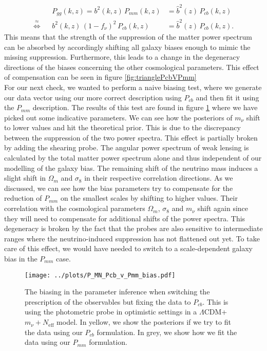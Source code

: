 \documentclass[../main.tex]{subfiles}
\begin{document}
\begin{align}
    &&P_{gg}(k,z) = b^2(k,z)\,P_{mm}(k,z) &= \hat{b}^2(z)\,P_{cb}(k,z)\nonumber\\
    \overset{\approx}{\Longleftrightarrow}&& b^2(k,z)\,(1-f_\nu)^2\,P_{cb}(k,z) &= \hat{b}^2(z)\,P_{cb}(k,z).\nonumber
\end{align}
This means that the strength of the suppression of the matter power spectrum can be absorbed by accordingly shifting all galaxy biases enough to mimic the missing suppression. Furthermore, this leads to a change in the degeneracy directions of the biases concerning the other cosmological parameters. This effect of compensation can be seen in figure \ref{fig:trianglePcbVPmm}\\
For our next check, we wanted to perform a naive biasing test, where we generate our data vector using our more correct description using $P_{cb}$ and then fit it using the $P_{mm}$ description. The results of this test are found in figure \ref{fig:trianglePcbVPmm_biased} where we have picked out some indicative parameters. We can see how the posteriors of $m_\nu$ shift to lower values and hit the theoretical prior. This is due to the discrepancy between the suppression of the two power spectra. This effect is partially broken by adding the shearing probe. The angular power spectrum of weak lensing is calculated by the total matter power spectrum alone and thus independent of our modelling of the galaxy bias. The remaining shift of the neutrino mass induces a slight shift in $\Omega_m$ and $\sigma_8$ in their respective correlation directions. As we discussed, we can see how the bias parameters try to compensate for the reduction of $P_{mm}$ on the smallest scales by shifting to higher values. Their correlation with the cosmological parameters $\Omega_m$, $\sigma_8$ and $m_\nu$ shift again since they will need to compensate for additional shifts of the power spectra. This degeneracy is broken by the fact that the probes are also sensitive to intermediate ranges where the neutrino-induced suppression has not flattened out yet. To take care of this effect, we would have needed to switch to a scale-dependent galaxy bias in the $P_{mm}$ case.\newline
\begin{figure}
    \centering
    \caption{The biasing in the parameter inference when switching the prescription of the observables but fixing the data to $P_{cb}$. This is using the photometric probe in optimistic settings in a $\Lambda$CDM+$m_\nu+N_\mathrm{eff}$ model. In yellow, we show the posteriors if we try to fit the data using our $P_{cb}$ formulation. In grey, we show how we fit the data using our $P_{mm}$ formulation.}
    \texttt{[image: ../plots/P\_MN\_Pcb\_v\_Pmm\_bias.pdf]}
    \label{fig:trianglePcbVPmm_biased}
\end{figure}
\end{document}
